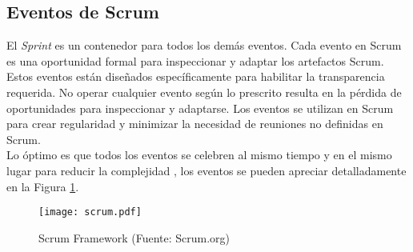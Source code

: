 \begin{spacing}{1.5}
	\subsection{Eventos de Scrum}
		El \textit{Sprint} es un contenedor para todos los demás eventos. Cada evento en Scrum es una oportunidad formal para inspeccionar y adaptar los artefactos Scrum. Estos eventos están diseñados específicamente para habilitar la transparencia requerida. No operar cualquier evento según lo prescrito resulta en la pérdida de oportunidades para inspeccionar y adaptarse. Los eventos se utilizan en Scrum para crear regularidad y minimizar la necesidad de reuniones no definidas en Scrum.\\
		Lo óptimo es que todos los eventos se celebren al mismo tiempo y en el mismo lugar para reducir la complejidad \cite{chap2_scrum}, los eventos se pueden apreciar detalladamente en la Figura \ref{figure:chaperII_1}.
		\begin{figure}[H]
			\texttt{[image: scrum.pdf]}
			\caption {\centering \small{Scrum Framework (Fuente: Scrum.org)}} \label{figure:chaperII_1}
		\end{figure}

\end{spacing}
